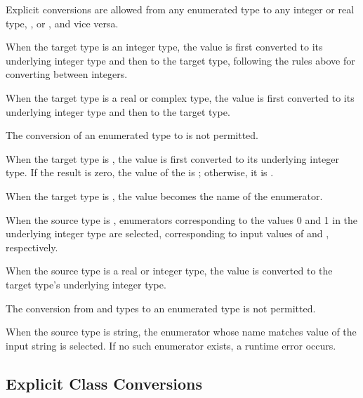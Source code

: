 Explicit conversions are allowed from any enumerated type to any
integer or real type, , or , and vice versa.

When the target type is an integer type, the value is first converted to its
underlying integer type and then to the target type, following the rules above
for converting between integers.

When the target type is a real or complex type, the value is first converted to
its underlying integer type and then to the target type.

The conversion of an enumerated type to  is not permitted.

When the target type is , the value is first converted to its
underlying integer type.  If the result is zero, the value of the 
is ; otherwise, it is .

When the target type is , the value becomes the name of the
enumerator.  %

When the source type is , enumerators corresponding to the values 0
and 1 in the underlying integer type are selected, corresponding to input values
of  and , respectively.


When the source type is a real or integer type, the value is converted to the
target type's underlying integer type.  

The conversion from  and  types to an enumerated type is not
permitted.

When the source type is string, the enumerator whose name matches value of the input
string is selected.  If no such enumerator exists, a runtime error occurs.

\subsection{Explicit Class Conversions}
\label{Explicit_Class_Conversions}

